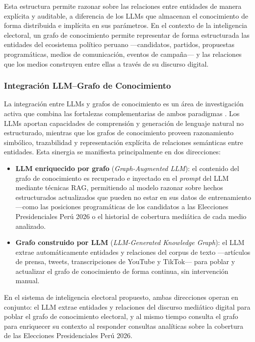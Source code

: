 Esta estructura permite razonar sobre las relaciones entre entidades de manera explícita y auditable, a diferencia de los LLMs que almacenan el conocimiento de forma distribuida e implícita en sus parámetros. En el contexto de la inteligencia electoral, un grafo de conocimiento permite representar de forma estructurada las entidades del ecosistema político peruano —candidatos, partidos, propuestas programáticas, medios de comunicación, eventos de campaña— y las relaciones que los medios construyen entre ellas a través de su discurso digital.

\subsubsection{Integración LLM–Grafo de Conocimiento}

La integración entre LLMs y grafos de conocimiento es un área de investigación activa que combina las fortalezas complementarias de ambos paradigmas \parencite{bk_pan2024unifying}. Los LLMs aportan capacidades de comprensión y generación de lenguaje natural no estructurado, mientras que los grafos de conocimiento proveen razonamiento simbólico, trazabilidad y representación explícita de relaciones semánticas entre entidades. Esta sinergia se manifiesta principalmente en dos direcciones:

\begin{itemize}
    \item \textbf{LLM enriquecido por grafo} (\textit{Graph-Augmented LLM}): el contenido del grafo de conocimiento es recuperado e inyectado en el \textit{prompt} del LLM mediante técnicas RAG, permitiendo al modelo razonar sobre hechos estructurados actualizados que pueden no estar en sus datos de entrenamiento —como las posiciones programáticas de los candidatos a las Elecciones Presidenciales Perú 2026 o el historial de cobertura mediática de cada medio analizado.
    \item \textbf{Grafo construido por LLM} (\textit{LLM-Generated Knowledge Graph}): el LLM extrae automáticamente entidades y relaciones del corpus de texto —artículos de prensa, tweets, transcripciones de YouTube y TikTok— para poblar y actualizar el grafo de conocimiento de forma continua, sin intervención manual.
\end{itemize}

En el sistema de inteligencia electoral propuesto, ambas direcciones operan en conjunto: el LLM extrae entidades y relaciones del discurso mediático digital para poblar el grafo de conocimiento electoral, y al mismo tiempo consulta el grafo para enriquecer su contexto al responder consultas analíticas sobre la cobertura de las Elecciones Presidenciales Perú 2026.

